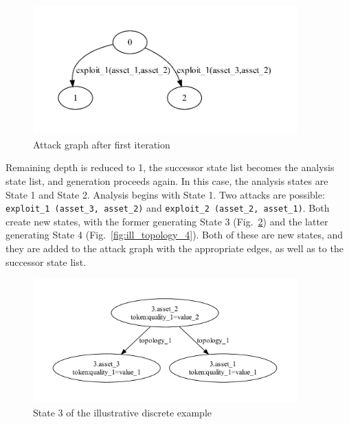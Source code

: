 \begin{figure}
\includegraphics[width=4in]{ag_illustrative_simple/ag_depth1}
\caption{Attack graph after first iteration}
\label{fig:ill_ag_depth1}
\end{figure}

Remaining depth is reduced to 1, the successor state list becomes the
analysis state list, and generation proceeds again. In this case, the
analysis states are State 1 and State 2. Analysis begins with State 1. 
Two attacks are possible: \texttt{exploit\_1 (asset\_3, asset\_2)} and
\texttt{exploit\_2 (asset\_2, asset\_1)}. Both create new states, with the
former generating State 3 (Fig.~\ref{fig:ill_topology_3}) and the latter
generating State 4 (Fig.~\ref{fig:ill_topology_4}). Both of these are new
states, and they are added to the attack graph with the appropriate edges, as
well as to the successor state list.

\begin{figure}
\includegraphics[width=4in]{ag_illustrative_simple/nm_state3}
\caption{State 3 of the illustrative discrete example}
\label{fig:ill_topology_3}
\end{figure}

